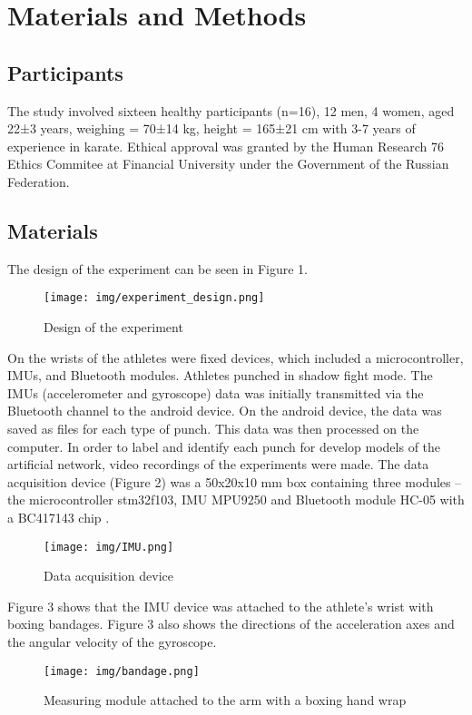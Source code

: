 \documentclass[sport,article,submit,moreauthors,pdftex]{Definitions/mdpi}
\begin{document}
\section{Materials and Methods}

\subsection{Participants}
The study involved sixteen healthy participants (n=16), 12 men, 4 women, aged 22±3 years, weighing = 70±14 kg, height = 165±21 cm with 3-7 years of experience in karate. Ethical approval was granted by the Human Research 76 Ethics Commitee at Financial University under the Government of the Russian Federation.

\subsection{Materials}
The design of the experiment can be seen in Figure 1.

\begin{figure}[H]
\texttt{[image: img/experiment\_design.png]}
\caption{Design of the experiment}
\end{figure}

On the wrists of the athletes were fixed devices, which included a microcontroller, IMUs, and Bluetooth modules. Athletes punched in shadow fight mode. The IMUs (accelerometer and gyroscope) data was initially transmitted via the Bluetooth channel to the android device. On the android device, the data was saved as files for each type of punch. This data was then processed on the computer. In order to label and identify each punch for develop models of the artificial network, video recordings of the experiments were made.
The data acquisition device (Figure 2) was a 50x20x10 mm box containing three modules – the microcontroller stm32f103\cite{ref-url1}, IMU MPU9250 and Bluetooth module HC-05 with a BC417143 chip \cite{ref-url2}.

\begin{figure}[H]
\texttt{[image: img/IMU.png]}
\caption{Data acquisition device}
\end{figure}

Figure 3 shows that the IMU device was attached to the athlete's wrist with boxing bandages. Figure 3 also shows the directions of the acceleration axes and the angular velocity of the gyroscope.

\begin{figure}[H]
\texttt{[image: img/bandage.png]}
\caption{Measuring module attached to the arm with a boxing hand wrap}
\end{figure}
\end{document}
